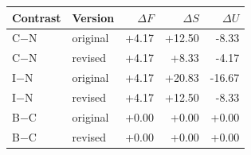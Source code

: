 \begin{tabular}{llrrr}
\toprule
Contrast & Version & $\Delta F$ & $\Delta S$ & $\Delta U$\\
\midrule
C$-$N & original & +4.17 & +12.50 & -8.33\\
C$-$N & revised & +4.17 & +8.33 & -4.17\\
I$-$N & original & +4.17 & +20.83 & -16.67\\
I$-$N & revised & +4.17 & +12.50 & -8.33\\
B$-$C & original & +0.00 & +0.00 & +0.00\\
B$-$C & revised & +0.00 & +0.00 & +0.00\\
\bottomrule
\end{tabular}
